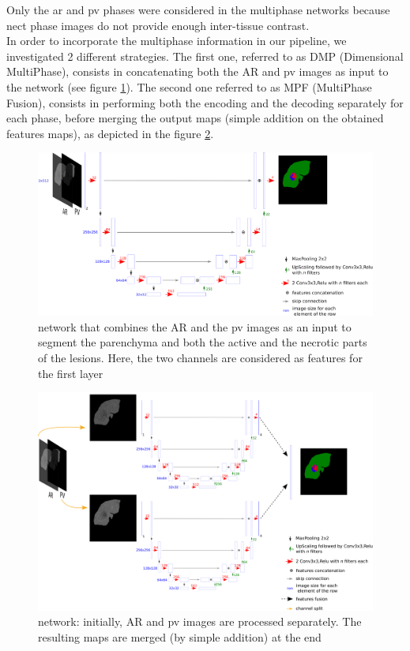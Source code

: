 Only the \ac{ar} and \ac{pv} phases were considered in the
multiphase networks because \ac{nect} phase images do not provide enough
inter-tissue contrast. \\
In order to incorporate the multiphase information in our pipeline, we
investigated 2 different strategies. The first one, referred to as DMP (Dimensional MultiPhase), consists in concatenating both the
AR and \ac{pv} images as input to the network (see figure \ref{CARS_DMP_Full_Fig}).
The second one referred to as MPF (MultiPhase Fusion), consists
in performing both the encoding and the decoding separately for each
phase, before merging the output maps (simple addition on the obtained
features maps), as depicted in the figure \ref{CARS_MPF_Full_Fig}.

\begin{figure}[th!]
	\centering
	\includegraphics[width=0.9\linewidth]{../SemanticSeg/images/image28}
	\caption{ network that combines the AR and the \ac{pv} images as an input to segment the parenchyma and both the active and the necrotic parts of the lesions. Here, the two channels are considered as features for the first layer}
	\label{CARS_DMP_Full_Fig}
\end{figure}


\begin{figure}[th!]
	\centering
	\includegraphics[width=0.9\linewidth]{../SemanticSeg/images/MPF_Full_8M_Resized_Font}
	\caption{ network: initially, AR and \ac{pv} images are processed separately. The resulting maps are merged (by simple addition) at the end}
	\label{CARS_MPF_Full_Fig}
\end{figure}



